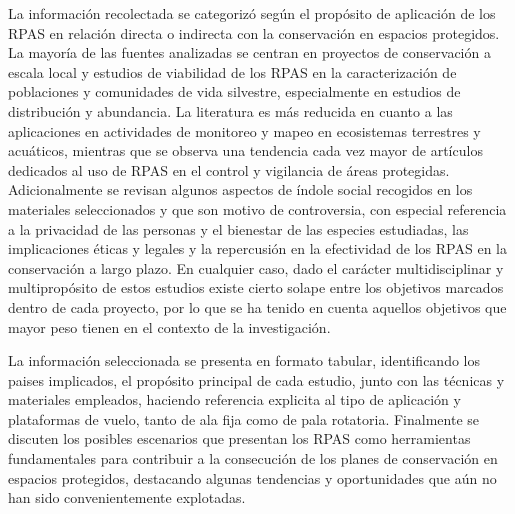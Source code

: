 \documentclass[11pt,]{article}
\begin{document}
La información recolectada se categorizó según el propósito de
aplicación de los RPAS en relación directa o indirecta con la
conservación en espacios protegidos. La mayoría de las fuentes
analizadas se centran en proyectos de conservación a escala local y
estudios de viabilidad de los RPAS en la caracterización de poblaciones
y comunidades de vida silvestre, especialmente en estudios de
distribución y abundancia. La literatura es más reducida en cuanto a las
aplicaciones en actividades de monitoreo y mapeo en ecosistemas
terrestres y acuáticos, mientras que se observa una tendencia cada vez
mayor de artículos dedicados al uso de RPAS en el control y vigilancia
de áreas protegidas. Adicionalmente se revisan algunos aspectos de
índole social recogidos en los materiales seleccionados y que son motivo
de controversia, con especial referencia a la privacidad de las personas
y el bienestar de las especies estudiadas, las implicaciones éticas y
legales y la repercusión en la efectividad de los RPAS en la
conservación a largo plazo. En cualquier caso, dado el carácter
multidisciplinar y multipropósito de estos estudios existe cierto solape
entre los objetivos marcados dentro de cada proyecto, por lo que se ha
tenido en cuenta aquellos objetivos que mayor peso tienen en el contexto
de la investigación.

La información seleccionada se presenta en formato tabular,
identificando los paises implicados, el propósito principal de cada
estudio, junto con las técnicas y materiales empleados, haciendo
referencia explicita al tipo de aplicación y plataformas de vuelo, tanto
de ala fija como de pala rotatoria. Finalmente se discuten los posibles
escenarios que presentan los RPAS como herramientas fundamentales para
contribuir a la consecución de los planes de conservación en espacios
protegidos, destacando algunas tendencias y oportunidades que aún no han
sido convenientemente explotadas.
\end{document}
